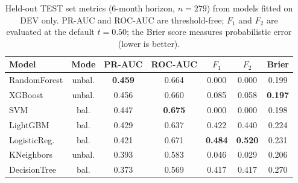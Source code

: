 \begin{table}[ht!]
\centering
\caption[Held-out TEST set metrics, 6-month]{Held-out TEST set metrics (6-month horizon, $n\!=\!279$) from models fitted on DEV only. PR-AUC and ROC-AUC are threshold-free; $F_1$ and $F_2$ are evaluated at the default $t\!=\!0.50$; the Brier score measures probabilistic error (lower is better).}
\label{tab:step6_test_metrics}
\small
\begin{tabular}{l c c c c c c}
\toprule
Model & Mode & PR-AUC & ROC-AUC & $F_1$ & $F_2$ & Brier \\
\midrule
  RandomForest  & unbal. & \textbf{0.459} & 0.664 & 0.000 & 0.000 & 0.199 \\
  XGBoost       & unbal. & 0.456 & 0.660 & 0.085 & 0.058 & \textbf{0.197} \\
  SVM           & bal.   & 0.447 & \textbf{0.675} & 0.000 & 0.000 & 0.198 \\
  LightGBM      & bal.   & 0.429 & 0.637 & 0.422 & 0.440 & 0.224 \\
  LogisticReg.  & bal.   & 0.421 & 0.671 & \textbf{0.484} & \textbf{0.520} & 0.231 \\
  KNeighbors    & unbal. & 0.393 & 0.583 & 0.046 & 0.029 & 0.206 \\
  DecisionTree  & bal.   & 0.373 & 0.569 & 0.417 & 0.417 & 0.270 \\
\bottomrule
\end{tabular}
\end{table}\hfill

